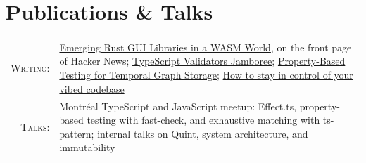 \documentclass[letterpaper,10pt]{article}
\begin{document}
\section{Publications \& Talks}
\begin{longtable}{@{}r p{}@{}}
  \textsc{Writing:}& \href{https://monadical.com/posts/shades-of-rust-gui-library-list.html}{Emerging Rust GUI Libraries in a WASM World}, on the front page of Hacker News; \href{https://monadical.com/posts/typescript-validators-jamboree.html}{TypeScript Validators Jamboree}; \href{https://monadical.com/posts/property-based-testing-for-temporal-graph-storage.html}{Property-Based Testing for Temporal Graph Storage}; \href{https://monadical.com/posts/vibe-code-how-to-stay-in-control.html}{How to stay in control of your vibed codebase}\\[0.35em]
  \textsc{Talks:}& Montr\'eal TypeScript and JavaScript meetup: Effect.ts, property-based testing with fast-check, and exhaustive matching with ts-pattern; internal talks on Quint, system architecture, and immutability\\
\end{longtable}
\end{document}

